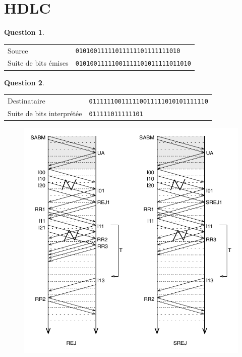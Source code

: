 \documentclass[11pt,english,french]{scrreprt}
\theoremstyle{remark}
\theoremstyle{definition}
\newtheorem{ques}{Question}[section]
\begin{document}
\section{HDLC} %

\begin{ques}\hfill
	
	\begin{tabularx}{\textwidth}{lX}
		Source & \lstinline!01010011111011111101111111010!\\
		Suite de bits émises &\lstinline!01010011111001111101011111011010!
	\end{tabularx}
\end{ques}

\begin{ques}\hfill
	
	\begin{tabularx}{\textwidth}{lX}
		Destinataire & \lstinline!011111100111110011111010101111110!\\
		Suite de bits interprétée &\lstinline!011111011111101!
	\end{tabularx}
\end{ques}

\begin{figure}[h]
  \centering
  \includegraphics[scale=1.5]{Exam2009/hdlc}
\end{figure}
\end{document}
